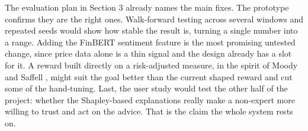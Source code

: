 \documentclass[12pt,twoside,letterpaper]{article}
\begin{document}
The evaluation plan in Section 3 already names the main fixes. The prototype confirms
they are the right ones. Walk-forward testing across several windows and repeated
seeds would show how stable the result is, turning a single number into a range.
Adding the FinBERT sentiment feature is the most promising untested change, since
price data alone is a thin signal and the design already has a slot for it. A reward
built directly on a risk-adjusted measure, in the spirit of Moody and Saffell
\cite{moody2001}, might suit the goal better than the current shaped reward and cut
some of the hand-tuning. Last, the user study would test the other half of the
project: whether the Shapley-based explanations really make a non-expert more willing
to trust and act on the advice. That is the claim the whole system rests on.

\newpage

\end{document}

